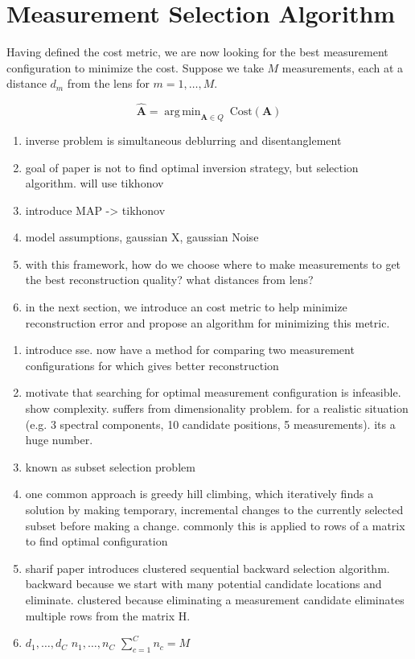 \documentclass{article}
\renewcommand{\vec}[1]{\ensuremath{\mathbf{#1}}}
\providecommand{\vA}{\vec{A}}
\DeclareMathOperator*{\argmin}{arg\,min}
\begin{document}
\section{Measurement Selection Algorithm}
Having defined the cost metric, we are now looking for the best measurement
configuration to minimize the cost. Suppose we take $M$ measurements, each at
a distance $d_m$ from the lens for $m = 1, \dots, M$. 

\begin{equation}
\hat {\bm A} = \argmin_{\vA \in Q} \ \text{Cost}(\bm{A})
\label{eq:inverse}
\end{equation}

\begin{enumerate}
    \item inverse problem is simultaneous deblurring and disentanglement
    \item goal of paper is not to find optimal inversion strategy, but selection
          algorithm. will use tikhonov
    \item introduce MAP -> tikhonov
    \item model assumptions, gaussian X, gaussian Noise
      \item with this framework, how do we choose where to make measurements to
        get the best reconstruction quality? what distances from lens?
        \item in the next section, we introduce an cost metric to help minimize
          reconstruction error and propose an algorithm for minimizing this metric.
\end{enumerate}

\begin{enumerate}
  \item introduce sse.  now have a method for comparing two measurement
    configurations for which gives better reconstruction
  \item motivate that searching for optimal measurement configuration is
    infeasible.  show complexity.  suffers from dimensionality problem. for a realistic situation (e.g. 3 spectral
    components, 10 candidate positions, 5 measurements). its a huge number.
  \item known as subset selection problem
  \item one common approach is greedy hill climbing, which iteratively finds
    a solution by making temporary, incremental changes to the currently
    selected subset before making a change. commonly this is applied to rows
    of a matrix to find optimal configuration
  \item sharif paper introduces clustered sequential backward selection
    algorithm.  backward because we start with many potential candidate locations and eliminate.
    clustered because eliminating a measurement candidate eliminates
    multiple rows from the matrix H.
    \item $d_1, \dots, d_C$  $n_1, \dots, n_C$  $\sum_{c=1}^C n_c = M$
\end{enumerate}
\end{document}
